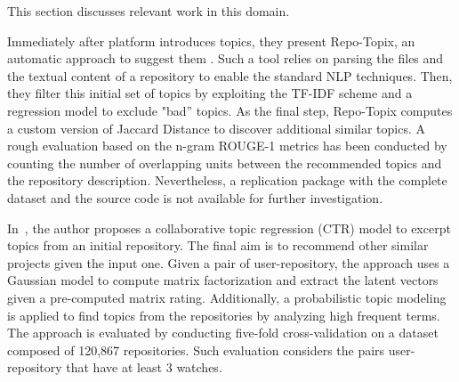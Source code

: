 This section discusses relevant work in this domain.



Immediately after \GH platform introduces topics, they present Repo-Topix, an automatic approach to suggest them \cite{ganesan_topic_2017}. Such a tool relies on parsing the \RM files and the textual content of a repository to enable the standard NLP techniques. Then, they filter this initial set of topics by exploiting the TF-IDF scheme and a regression model to exclude "bad'' topics. As the final step, Repo-Topix computes a custom version of Jaccard Distance to discover additional similar topics. A rough evaluation based on the n-gram ROUGE-1 metrics has been conducted by counting the number of overlapping units between the recommended topics and the repository description. Nevertheless, a replication package with the complete dataset and the source code is not available for further investigation.





In~\cite{orii2012collaborative}, the author proposes a collaborative topic regression (CTR) model to excerpt topics from an initial \GH repository. The final aim is to recommend other similar projects given the input one. Given a pair of user-repository, the approach uses a Gaussian model to compute matrix factorization and extract the latent vectors given a pre-computed matrix rating. Additionally, a probabilistic topic modeling is applied to find topics from the repositories by analyzing high frequent terms. The approach is evaluated by conducting five-fold cross-validation on a dataset composed of  120,867 repositories. Such evaluation considers the pairs user-repository that have at least 3 watches. 


